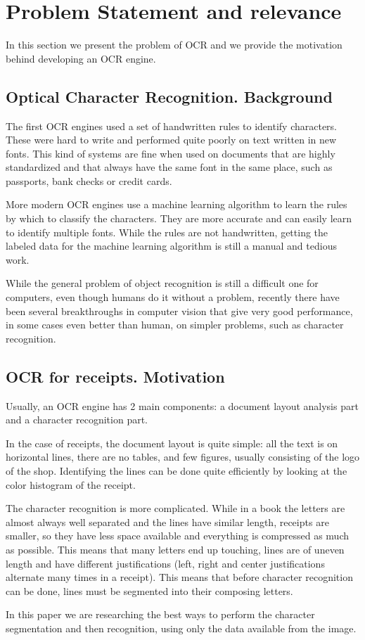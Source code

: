 \section{Problem Statement and relevance}
\label{sec:statement}
In this section we present the problem of OCR and we provide the motivation behind developing an OCR engine. 

\subsection{Optical Character Recognition. Background}

The first OCR engines used a set of handwritten rules to identify characters\cite{shepard1971reading}. These were hard to write and performed quite poorly on text written in new fonts. This kind of systems are fine when used on documents that are highly standardized and that always have the same font in the same place, such as passports, bank checks or credit cards. 

More modern OCR engines use a machine learning algorithm to learn the rules by which to classify the characters\cite{smith2007overview}. They are more accurate and can easily learn to identify multiple fonts. While the rules are not handwritten, getting the labeled data for the machine learning algorithm is still a manual and tedious work. 

While the general problem of object recognition is still a difficult one for computers, even though humans do it without a problem, recently there have been several breakthroughs in computer vision that give very good performance, in some cases even better than human, on simpler problems, such as character recognition. 

\subsection{OCR for receipts. Motivation}
Usually, an OCR engine has 2 main components: a document layout analysis part and a character recognition part. 

In the case of receipts, the document layout is quite simple: all the text is on horizontal lines, there are no tables, and few figures, usually consisting of the logo of the shop. Identifying the lines can be done quite efficiently by looking at the color histogram of the receipt. 

The character recognition is more complicated. While in a book the letters are almost always well separated and the lines have similar length, receipts are smaller, so they have less space available and everything is compressed as much as possible. This means that many letters end up touching, lines are of uneven length and have different justifications (left, right and center justifications alternate many times in a receipt). This means that before character recognition can be done, lines must be segmented into their composing letters. 

In this paper we are researching the best ways to perform the character segmentation and then recognition, using only the data available from the image. 